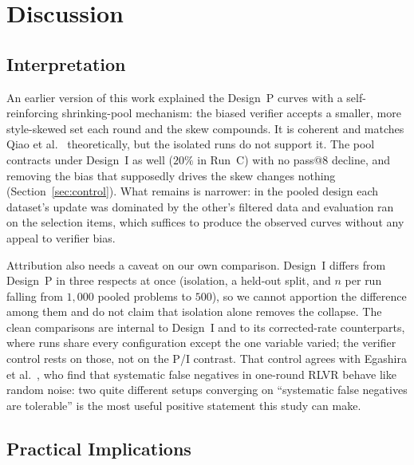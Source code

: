 \documentclass[runningheads]{llncs}
\begin{document}
\section{Discussion}
\label{sec:discussion}

\subsection{Interpretation}
\label{sec:threevars}

An earlier version of this work explained the Design~P curves with a
self-reinforcing shrinking-pool mechanism: the biased verifier accepts a smaller,
more style-skewed set each round and the skew compounds. It is coherent and
matches Qiao et al.~\cite{ref_selectionbias} theoretically, but the isolated runs
do not support it. The pool contracts under Design~I as well ($20\%$ in Run~C)
with no pass@8 decline, and removing the bias that supposedly drives the skew
changes nothing (Section~\ref{sec:control}). What remains is narrower: in the
pooled design each dataset's update was dominated by the other's filtered data and
evaluation ran on the selection items, which suffices to produce the observed
curves without any appeal to verifier bias.

Attribution also needs a caveat on our own comparison. Design~I differs from
Design~P in three respects at once (isolation, a held-out split, and $n$ per run
falling from $1{,}000$ pooled problems to $500$), so we cannot apportion the
difference among them and do not claim that isolation alone removes the collapse.
The clean comparisons are internal to Design~I and to its corrected-rate
counterparts, where runs share every configuration except the one variable varied;
the verifier control rests on those, not on the P/I contrast. That control agrees
with Egashira et al.~\cite{ref_delayplateau}, who find that systematic false
negatives in one-round RLVR behave like random noise: two quite different setups
converging on ``systematic false negatives are tolerable'' is the most useful
positive statement this study can make.

\subsection{Practical Implications}
\end{document}
